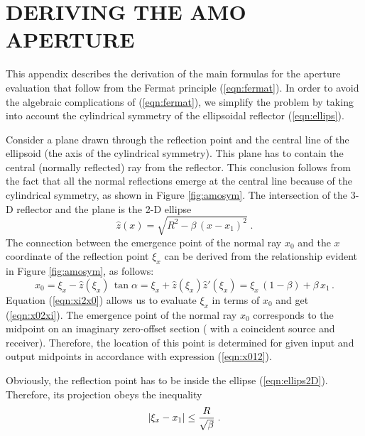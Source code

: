 \section{DERIVING THE AMO APERTURE}

This appendix describes the derivation of the main formulas for the
aperture evaluation that follow from the Fermat principle (\ref{eqn:fermat}).
In order to avoid the algebraic
complications  of (\ref{eqn:fermat}), we simplify the
problem by taking into account the cylindrical symmetry of the ellipsoidal
reflector (\ref{eqn:ellips}).
\par
Consider a plane drawn through the reflection point and the central line
of the ellipsoid (the axis of the cylindrical symmetry). This plane
has to contain the central (normally reflected) ray from the
reflector. This conclusion follows from the fact that all the normal
reflections emerge at the central line because of the cylindrical
symmetry, as shown in Figure \ref{fig:amosym}. The intersection of the 3-D
reflector and the plane is the 
2-D ellipse
\begin{equation}
\hat{z}(x)=\sqrt{R^2-\beta\,\left(x-x_1\right)^2}\;.
\label{eqn:ellips2D}
\end{equation}
The connection between the emergence point of the normal ray $x_0$ and
the $x$ coordinate of the reflection point $\xi_x$ can be derived from the
relationship evident in Figure \ref{fig:amosym}, as follows:
\begin{equation}
x_0=\xi_x-\hat{z}\left(\xi_x\right)\,\tan{\alpha}=
\xi_x+\hat{z}\left(\xi_x\right)\hat{z}'\left(\xi_x\right)=\xi_x\,(1-\beta)+
\beta\,x_1\,.
\label{eqn:xi2x0}
\end{equation}
Equation (\ref{eqn:xi2x0}) allows us to evaluate $\xi_x$ in terms of
$x_0$ and get (\ref{eqn:x02xi}). The emergence point of the normal ray $x_0$
corresponds to the 
midpoint on an imaginary zero-offset section ( with a coincident
source and receiver). Therefore, the location of this point is
determined for given input 
and output midpoints in accordance with expression (\ref{eqn:x012}).
\par
Obviously, the reflection point has to be inside the ellipse
(\ref{eqn:ellips2D}). Therefore, its projection obeys the inequality
\begin{equation}
\left|\xi_x-x_1\right| \leq {R\over \sqrt{\beta}}\;.
\label{eqn:xileq}
\end{equation} 
